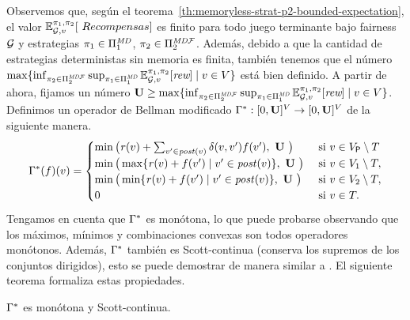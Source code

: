 Observemos que, según el teorema~\ref{th:memoryless-strat-p2-bounded-expectation}, el valor $\Expect{\strat{1}}{\strat{2}}_{\StochG,v}[\ Recompensas]$ es finito
para todo juego terminante bajo fairness $\mathcal{G}$ y estrategias $\pi_{1} \in \Pi^{\textit{MD}}_{1}$, $\pi_{2} \in \Pi^{\textit{MD}\mathcal{F}}_{2}$.
 Además, debido a que la cantidad de estrategias deterministas sin memoria es finita, también tenemos que el número
 $\max \{ \inf_{\pi_{2} \in \Pi^{\textit{MD}\mathcal{F}}_{2}} \sup_{\pi_{1} \in \Pi^{\textit{MD}}_{1}} \mathbb{E}^{\pi_{1}, \pi_{ 2}}_{\mathcal{G},v}[\textit{rew}] \mid v \in V \}$ está bien definido.
      A partir de ahora, fijamos un número $\mathbf{U} \geq \max \{ \inf_{\pi_{2} \in \Pi^{\textit{MD}\mathcal{F}}_{2}} \sup_{\pi_{1} \in \Pi^{\textit{MD}}_{1}} \mathbb{E}^{\pi_{1}, \pi_{2}}_{\mathcal{G},v}[\textit{rew}] \mid v \in V \}$. Definimos un operador de Bellman modificado
$\Gamma^*: [0,\mathbf{U}]^V \rightarrow [0,\mathbf{U}]^V$ de la siguiente manera.
\[
    \Bellman(f)(v) =
    \begin{cases}
          \min \big( \reward(v) + \sum_{v' \in \post(v)} \delta(v,v')  f(v'),  \ \UpperBound \ \big ) & \text{ si } v \in V_\Probabilistic \setminus T  \\
          \min\big( \max\{\reward(v)  + f(v') \mid v' \in \post(v) \}, \ \UpperBound  \ \big)& \text{ si } v \in  V_1 \setminus T, \\
          \min\big( \min\{\reward(v)  + f(v') \mid v' \in \post(v) \}, \ \UpperBound \ \big) & \text{ si } v \in  V_2 \setminus T, \\
           0 & \text{ si } v \in T.
    \end{cases}
\]
Tengamos en cuenta que $\Gamma^*$ es monótona, lo que puede probarse observando que los máximos, mínimos y combinaciones convexas son todos operadores monótonos.
Además, $\Gamma^*$ también es Scott-continua (conserva los supremos de los conjuntos dirigidos), esto se puede demostrar de manera similar a \cite{DBLP:conf/memics/BrazdilKN12}. El siguiente teorema
formaliza estas propiedades.
\begin{theorem}\label{th:continuity} $\Gamma^*$ es monótona y Scott-continua.
\end{theorem}

